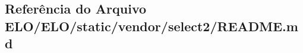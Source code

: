 \hypertarget{ELO_2ELO_2static_2vendor_2select2_2README_8md}{}\subsection{Referência do Arquivo E\+L\+O/\+E\+L\+O/static/vendor/select2/\+R\+E\+A\+D\+M\+E.md}
\label{ELO_2ELO_2static_2vendor_2select2_2README_8md}
